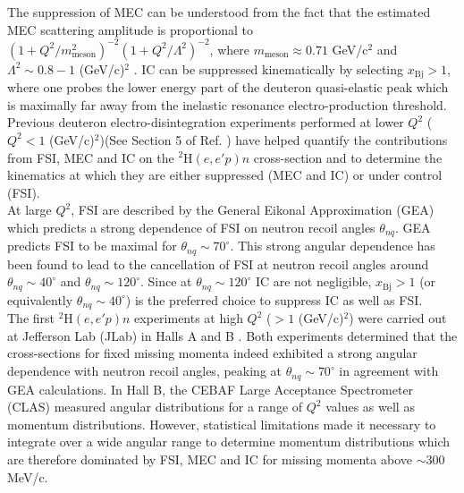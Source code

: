 The suppression of MEC can be understood from the fact that the estimated MEC scattering amplitude is proportional to  $(1 + Q^{2}/m^{2}_{\mathrm{meson}})^{-2}(1+Q^{2}/\Lambda^{2})^{-2}$, where $m_{\mathrm{meson}}\approx0.71$ GeV/c$^{2}$ and
$\Lambda^{2}\sim 0.8-1 $ (GeV/c)$^{2}$ \cite{Sargsian_2001}. IC can be suppressed kinematically by selecting $x_{\mathrm{Bj}}>1$, where one probes the lower energy part of the deuteron quasi-elastic peak which is maximally far away from the inelastic resonance
electro-production threshold.\\
\indent Previous deuteron electro-disintegration experiments performed at lower $Q^{2}$ ($Q^{2}<1$ (GeV/c)$^{2}$)(See Section 5 of Ref. \cite{sargsian_2015}) have helped quantify the contributions
from FSI, MEC and IC on the $^{2}\mathrm{H}(e,e'p)n$ cross-section and to determine the kinematics at which they are either suppressed (MEC and IC) or under control (FSI).  \\
\indent At large $Q^{2}$, FSI are described by the General Eikonal Approximation (GEA) \cite{Sargsian_2001,PhysRevC.56.1124,sargsian_2015} which predicts a strong dependence of FSI on neutron recoil angles $\theta_{nq}$.
GEA predicts FSI to be maximal for $\theta_{nq}\sim70^{\circ}$. This strong angular dependence has been found to lead to the cancellation of FSI at neutron recoil angles around $\theta_{nq}\sim40^{\circ}$ and $\theta_{nq}\sim120^{\circ}$. Since at $\theta_{nq}\sim120^{\circ}$ IC are not negligible, $x_{\mathrm{Bj}}>1$ (or equivalently $\theta_{nq}\sim40^{\circ}$) is the preferred choice to suppress IC as well as FSI. \\
\indent The first $^{2}\mathrm{H}(e,e'p)n$ experiments at high $Q^{2}$ ($>1$ (GeV/c)$^{2}$) were carried out at Jefferson Lab (JLab) in Halls A \cite{PhysRevLett.107.262501} and B \cite{PhysRevLett.98.262502}. Both
experiments determined that the cross-sections for fixed missing momenta indeed exhibited a strong angular dependence with neutron recoil angles, peaking
at $\theta_{nq} \sim 70^{\circ}$ in agreement with GEA \cite{Sargsian_2001,PhysRevC.56.1124} calculations. In Hall B, the CEBAF Large Acceptance Spectrometer (CLAS) measured angular
distributions for  a range of $Q^2$ values as well as momentum distributions. However, statistical limitations made it necessary to integrate over a wide angular range to determine momentum distributions
which are therefore dominated by  FSI, MEC and IC for missing momenta above $\sim 300$ MeV/c. \\

